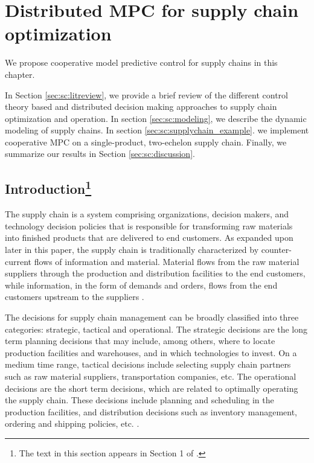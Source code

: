\newcommand{\I}{\mathcal{I}}
\newcommand{\BO}{\textrm{BO}}
\newcommand{\IP}{\textrm{Ip}}
\newcommand{\UP}{\textrm{Up}}
\newcommand{\DN}{\textrm{Dn}}
\newcommand{\Inv}{\textrm{Iv}}
\newcommand{\Dem}{\textrm{Dm}}
\chapter{Distributed MPC for supply chain optimization}
\label{chap:sc}
We propose cooperative model predictive control for supply chains in
this chapter. 

In Section \ref{sec:sc:litreview}, we provide a brief review of the
different control theory based and distributed decision making
approaches to supply chain optimization and operation. In section
\ref{sec:sc:modeling}, we describe the dynamic modeling of supply
chains. In section \ref{sec:sc:supplychain_example}. we implement
cooperative MPC on a 
single-product, two-echelon supply chain. Finally, we summarize our
results  in Section \ref{sec:sc:discussion}.

\section{Introduction\footnote{ The text in this section appears in Section 1 of
\citet{subramanian:rawlings:maravelias:2012}.}}
\label{sec:sc:intro}
The supply chain is a system comprising organizations, decision
makers, and  technology decision policies that is responsible for
transforming raw materials into finished products that are delivered
to end customers. 
As expanded upon later in this paper,
the supply chain is traditionally characterized
by counter-current flows of information and material. Material
flows from the raw material suppliers through the production and
distribution facilities to the end customers, while information, in
the form of demands and orders, flows from the end customers upstream
to the suppliers \citep{backx:bosgra:marquardt:1998,beamon:1998}.


The decisions for supply chain management can be broadly classified
into three categories: strategic, tactical and operational. The
strategic decisions   
are the long term planning decisions that may include, among others,
where to locate production facilities and warehouses,
and in which technologies to invest. On a medium time range,
tactical decisions include selecting supply chain partners such as raw
material suppliers, transportation companies, etc. The operational
decisions are the short term decisions, which are related to optimally
operating the supply chain. These decisions include planning and
scheduling in the production facilities, and distribution decisions
such as inventory management, ordering and shipping policies,
etc. \citep{shah:2005,ganeshan:harrison:1995}. 

